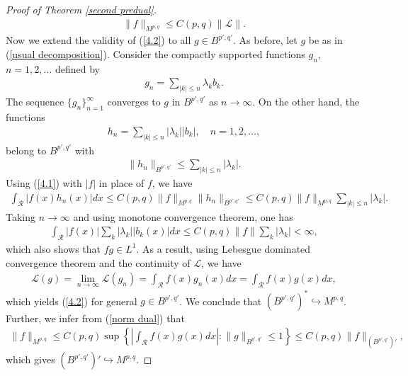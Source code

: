 \documentclass[10pt,reqno]{amsart}
\numberwithin{equation}{section}
\begin{document}
\begin{proof}[Proof of Theorem \ref{second predual}]
\begin{align}
\|f\|_{M^{p,q}}\leq C(p,q)\|\mathcal{L}\|.
\end{align}
Now we extend the validity of (\ref{4.2}) to all $g\in B^{p',q'}$. As before, let $g$ be as in (\ref{usual decomposition}). Consider the compactly supported functions $g_{n}$, $n=1,2,\ldots$ defined by
\begin{align*}
g_{n}=\sum_{|k|\leq n}\lambda_{k}b_{k}.
\end{align*}
The sequence $\{g_{n}\}_{n=1}^{\infty}$ converges to $g$ in $B^{p',q'}$ as $n\rightarrow\infty$. On the other hand, the functions 
\begin{align*}
h_{n}=\sum_{|k|\leq n}|\lambda_{k}||b_{k}|,\quad n=1,2,\ldots,
\end{align*}
belong to $B^{p',q'}$ with 
\begin{align*}
\|h_{n}\|_{B^{p',q'}}\leq\sum_{|k|\leq n}|\lambda_{k}|.
\end{align*}
Using (\ref{4.1}) with $|f|$ in place of $f$, we have 
\begin{align*}
\int_{\mathcal{R}}|f(x)h_{n}(x)|dx\leq C(p,q)\|f\|_{M^{p,q}}\|h_{n}\|_{B^{p',q'}}\leq C(p,q)\|f\|_{M^{p,q}}\sum_{|k|\leq n}|\lambda_{k}|.
\end{align*}
Taking $n\rightarrow\infty$ and using monotone convergence theorem, one has
\begin{align*}
\int_{\mathcal{R}}|f(x)|\sum_{k}|\lambda_{k}||b_{k}(x)|dx\leq C(p,q)\|f\|\sum_{k}|\lambda_{k}|<\infty,
\end{align*}
which also shows that $fg\in L^{1}$. As a result, using Lebesgue dominated convergence theorem and the continuity of $\mathcal{L}$, we have
\begin{align*}
\mathcal{L}(g)=\lim_{n\rightarrow\infty}\mathcal{L}(g_{n})=\int_{\mathcal{R}}f(x)g_{n}(x)dx=\int_{\mathcal{R}}f(x)g(x)dx,
\end{align*}
which yields (\ref{4.2}) for general $g\in B^{p',q'}$. We conclude that $(B^{p',q'})^{\ast}\hookrightarrow M^{p,q}$. Further, we infer from (\ref{norm dual}) that 
\begin{align*}
\|f\|_{M^{p,q}}\leq C(p,q)\sup\left\{\left|\int_{\mathcal{R}}f(x)g(x)dx\right|:\|g\|_{B^{p',q'}}\leq 1\right\}\leq C(p,q)\|f\|_{(B^{p',q'})'},
\end{align*}
which gives $(B^{p',q'})'\hookrightarrow M^{p,q}$.


\end{proof}
\end{document}
